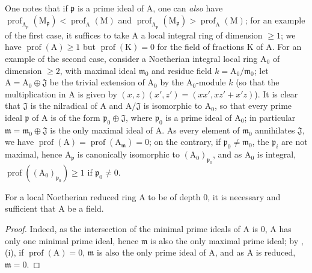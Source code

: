 \begin{env}[16.4.6.4]
\label{0.16.4.6.4}
One notes that if $\mathfrak{p}$ is a prime ideal of $\mathrm{A}$, one can \emph{also} have $\operatorname{prof}_{\mathrm{A}_\mathfrak{p}}(\mathrm{M}_\mathfrak{p})<\operatorname{prof}_\mathrm{A}(\mathrm{M})$ and $\operatorname{prof}_{\mathrm{A}_\mathfrak{p}}(\mathrm{M}_\mathfrak{p})>\operatorname{prof}_\mathrm{A}(\mathrm{M})$; for an example of the first case, it suffices to take $\mathrm{A}$ a local integral ring of dimension $\geq 1$; we have $\operatorname{prof}(\mathrm{A})\geq 1$ but $\operatorname{prof}(\mathrm{K})=0$ for the field of fractions $\mathrm{K}$ of $\mathrm{A}$.
For an example of the second case, consider a Noetherian integral local ring $\mathrm{A}_0$ of dimension $\geq 2$, with maximal ideal $\mathfrak{m}_0$ and residue field $k=\mathrm{A}_0/\mathfrak{m}_0$; let $\mathrm{A}=\mathrm{A}_0\oplus\mathfrak{J}$ be the trivial extension of $\mathrm{A}_0$ by the $\mathrm{A}_0$-module $k$ (so that the multiplication in $\mathrm{A}$ is given by $(x,z)(x',z')=(xx',xz'+x'z)$).
It is clear that $\mathfrak{J}$ is the nilradical of $\mathrm{A}$ and $\mathrm{A}/\mathfrak{J}$ is isomorphic to $\mathrm{A}_0$, so that every prime ideal $\mathfrak{p}$ of $\mathrm{A}$ is of the form $\mathfrak{p}_0\oplus\mathfrak{J}$, where $\mathfrak{p}_0$ is a prime ideal of $\mathrm{A}_0$; in particular $\mathfrak{m}=\mathfrak{m}_0\oplus\mathfrak{J}$ is the only maximal ideal of $\mathrm{A}$.
As every element of $\mathfrak{m}_0$ annihilates $\mathfrak{J}$, we have $\operatorname{prof}(\mathrm{A})=\operatorname{prof}(\mathrm{A}_\mathfrak{m})=0$; on the contrary, if $\mathfrak{p}_0\neq\mathfrak{m}_0$, the $\mathfrak{p}_i$ are not maximal, hence $\mathrm{A}_\mathfrak{p}$ is canonically isomorphic to $(\mathrm{A}_0)_{\mathfrak{p}_0}$, and as $\mathrm{A}_0$ is integral, $\operatorname{prof}((\mathrm{A}_0)_{\mathfrak{p}_0})\geq 1$ if $\mathfrak{p}_0\neq 0$.
\end{env}


\begin{corollary}[16.4.7]
\label{0.16.4.7}
For a local Noetherian reduced ring $\mathrm{A}$ to be of depth $0$, it is necessary and sufficient that $\mathrm{A}$ be a field.
\end{corollary}

\begin{proof}
Indeed, as the intersection of the minimal prime ideals of $\mathrm{A}$ is $0$, $\mathrm{A}$ has only one minimal prime ideal, hence $\mathfrak{m}$ is also the only maximal prime ideal; by , (i), if $\operatorname{prof}(\mathrm{A})=0$, $\mathfrak{m}$ is also the only prime ideal of $\mathrm{A}$, and as $\mathrm{A}$ is reduced, $\mathfrak{m}=0$.
\end{proof}

